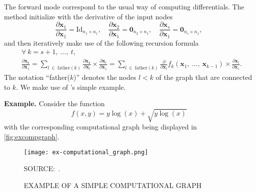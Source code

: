 The forward mode correspond to the usual way of computing differentials.
The method initialize with the derivative of the input nodes
\[
  \frac{\partial\bm{x}_{1}}{\partial\bm{x}_{1}} =
  \text{Id}_{n_{1} \times n_{1}},\quad
  \frac{\partial\bm{x}_{2}}{\partial\bm{x}_{1}} =
  \mathbf{0}_{n_{2} \times n_{1}},\quad
  \frac{\partial\bm{x}_{s}}{\partial\bm{x}_{1}} =
  \mathbf{0}_{n_{s} \times n_{1}},
\]
and then iteratively make use of the following recursion formula
\begin{align*}
  &\forall~k = s + 1,~\dots,~t,\\
  &\frac{\partial\bm{x}_{k}}{\partial\bm{x}_{1}} =
    \sum_{l~\in~\text{father}(k)}
    \frac{\partial\bm{x}_{k}}{\partial\bm{x}_{l}}\times
    \frac{\partial\bm{x}_{l}}{\partial\bm{x}_{1}} =
    \sum_{l~\in~\text{father}(k)}
    \frac{\partial}{\partial\bm{x}_{l}}
    f_{k}(\bm{x}_{1},~\dots,~\bm{x}_{k-1})\times
    \frac{\partial\bm{x}_{l}}{\partial\bm{x}_{1}}.
\end{align*}
The notation ``father(\(k\))'' denotes the nodes \(l < k\) of the graph
that are connected to \(k\). We make use of 's
simple example.

\noindent\textbf{Example.}\hspace{.5cm}
Consider the function
\[
  f(x, y) = y\log(x) + \sqrt{y\log(x)}
\]
with the corresponding computational graph being displayed in
\autoref{fig:excompgraph}.

\begin{figure}[H]
  \setlength{\abovecaptionskip}{.0001pt}
  \caption{EXAMPLE OF A SIMPLE COMPUTATIONAL GRAPH}
  \vspace{0.3cm} \centering
  \texttt{[image: ex-computational\_graph.png]}
  \\
  \vspace{0.3cm}
  \begin{footnotesize}
    SOURCE:~.
  \end{footnotesize}
  \label{fig:excompgraph}
\end{figure}

